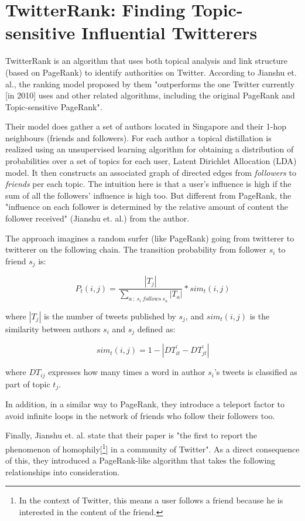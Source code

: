 \section{TwitterRank: Finding Topic-sensitive Influential Twitterers}

TwitterRank is an algorithm that uses both topical analysis and link structure (based on PageRank\cite{pagerank}) to identify authorities on Twitter. According to Jianshu et. al.\cite{twitterrank}, the ranking model proposed by them "outperforms the one Twitter currently [in 2010] uses and other related algorithms, including the original PageRank and Topic-sensitive PageRank".

Their model does gather a set of authors located in Singapore and their 1-hop neighbours (friends and followers). For each author a topical distillation is realized using an unsupervised learning algorithm for obtaining a distribution of probabilities over a set of topics for each user, Latent Dirichlet Allocation (LDA) model\cite{lda}. It then constructs an associated graph of directed edges from \textit{followers} to \textit{friends} per each topic.
The intuition here is that a user's influence is high if the sum of all the followers' influence is high too. But different from PageRank\cite{pagerank}, the "influence on each follower is determined by the relative amount of content the follower received" (Jianshu et. al.\cite{twitterrank}) from the author.

The approach imagines a random surfer (like PageRank\cite{pagerank}) going from twitterer to twitterer on the following chain. The transition probability from follower $s_i$ to friend $s_j$ is:

$$P_t(i,j) = \frac{|T_j|}{\sum\limits_{a\ :\ s_i\ follows\ s_a} |T_a|} * sim_t(i,j)$$

where $|T_j|$ is the number of tweets published by $s_j$, and $sim_t(i,j)$ is the similarity between authors $s_i$ and $s_j$ defined as:

$$sim_t(i,j) = 1 - |DT_{it}^{'} - DT_{jt}^{'}|$$

where $DT_{ij}$ expresses how many times a word in author $s_i$'s tweets is classified as part of topic $t_j$.

In addition, in a similar way to PageRank\cite{pagerank}, they introduce a teleport factor to avoid infinite loops in the network of friends who follow their followers too.

Finally, Jianshu et. al.\cite{twitterrank} state that their paper is "the first to report the phenomenon of homophily[\footnote{\label{notehomophily}In the context of Twitter, this means a user follows a friend because he is interested in the content of the friend.}] in a community of Twitter".
As a direct consequence of this, they introduced a PageRank-like algorithm that takes the following relationships into consideration.

